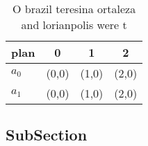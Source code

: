 \documentclass[a4paper]{article}
\begin{document}
\begin{table}
\begin{adjustbox}{width=0.6\columnwidth}
\begin{tabular}{|l|l|l|l|}
\hline
\textbf{plan} & \multicolumn{1}{c|}{\textbf{0}} & \multicolumn{1}{c|}{\textbf{1}} & \multicolumn{1}{c|}{\textbf{2}} \\ \hline
\textbf{$a_0$}  & (0,0) & (1,0) & (2,0) \\ \hline
\textbf{$a_1$}  & (0,0) & (1,0) & (2,0) \\ \hline
\end{tabular}
\end{adjustbox}
\caption{O brazil teresina ortaleza and lorianpolis were t
}
\end{table}

\subsection{SubSection}
\end{document}
